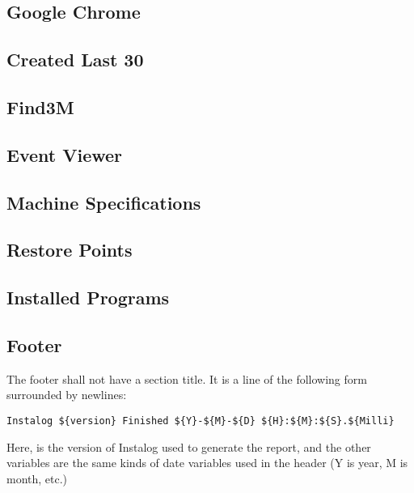 \subsection{Google Chrome}
\subsection{Created Last 30}
\subsection{Find3M}
\subsection{Event Viewer}
\subsection{Machine Specifications}
\subsection{Restore Points}
\subsection{Installed Programs}
\subsection{Footer}
The footer shall not have a section title. It is a line of the following form
surrounded by newlines:
\begin{verbatim}
Instalog ${version} Finished ${Y}-${M}-${D} ${H}:${M}:${S}.${Milli}
\end{verbatim}

Here,  is the version of Instalog used to generate the report, and
the other variables are the same kinds of date variables used in the header (Y
is year, M is month, etc.)
